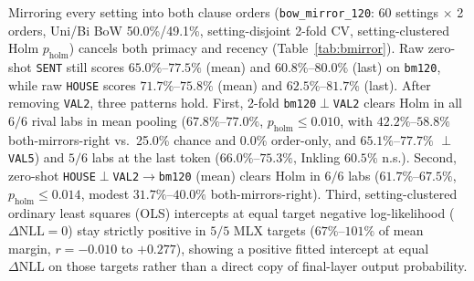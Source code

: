 \documentclass[conference]{IEEEtran}
\begin{document}
Mirroring every setting into both clause orders (\texttt{bow\_mirror\_120}: 60 settings $\times$ 2 orders, Uni/Bi BoW 50.0\%/49.1\%, setting-disjoint 2-fold CV, setting-clustered Holm $p_{\text{holm}}$) cancels both primacy and recency (Table~\ref{tab:bmirror}). Raw zero-shot \texttt{SENT} still scores $65.0\%$--$77.5\%$ (mean) and $60.8\%$--$80.0\%$ (last) on \texttt{bm120}, while raw \texttt{HOUSE} scores $71.7\%$--$75.8\%$ (mean) and $62.5\%$--$81.7\%$ (last). After removing \texttt{VAL2}, three patterns hold. First, 2-fold \texttt{bm120}$\perp$\texttt{VAL2} clears Holm in all $6/6$ rival labs in mean pooling ($67.8\%$--$77.0\%$, $p_{\text{holm}}\le0.010$, with $42.2\%$--$58.8\%$ both-mirrors-right vs.\ 25.0\% chance and 0.0\% order-only, and $65.1\%$--$77.7\%$ $\perp$\texttt{VAL5}) and $5/6$ labs at the last token ($66.0\%$--$75.3\%$, Inkling $60.5\%$ n.s.). Second, zero-shot \texttt{HOUSE}$\perp$\texttt{VAL2}$\to$\texttt{bm120} (mean) clears Holm in $6/6$ labs ($61.7\%$--$67.5\%$, $p_{\text{holm}}\le0.014$, modest $31.7\%$--$40.0\%$ both-mirrors-right). Third, setting-clustered ordinary least squares (OLS) intercepts at equal target negative log-likelihood ($\Delta\text{NLL}=0$) stay strictly positive in $5/5$ MLX targets ($67\%$--$101\%$ of mean margin, $r=-0.010$ to $+0.277$), showing a positive fitted intercept at equal $\Delta\text{NLL}$ on those targets rather than a direct copy of final-layer output probability.
\end{document}
